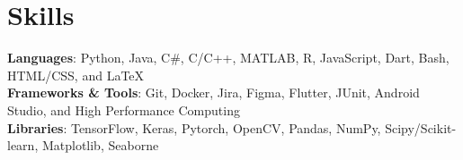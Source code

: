 \section{Skills}



 \begin{itemize}[leftmargin=0.15in, label={}]
    \small{\item{
     \textbf{Languages}{: Python, Java, C\#, C/C++, MATLAB, R, JavaScript, Dart, Bash, HTML/CSS, and \LaTeX} \\
     \textbf{Frameworks \& Tools}{: Git, Docker, Jira, Figma, Flutter, JUnit, Android Studio, and High Performance Computing} \\
     \textbf{Libraries}{: TensorFlow, Keras, Pytorch, OpenCV, Pandas, NumPy, Scipy/Scikit-learn, Matplotlib, Seaborne} %
    }}
 \end{itemize}
 
